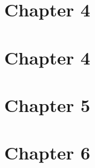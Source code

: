 \documentclass{wileySix}
\begin{document}
\chapter{Chapter 4}
%
%
%
%
%
%
%
%
%
%
%
%
%
%
%
%
%

\chapter{Chapter 4}
%
%
%
%
%
%
%
%
%
%
%
%
%
%
%
%


\chapter{Chapter 5}
%
%
%
%
%
%
%
%
%
%

\chapter{Chapter 6}
%
%
%
%
%
%
%
%
%

\end{document}
